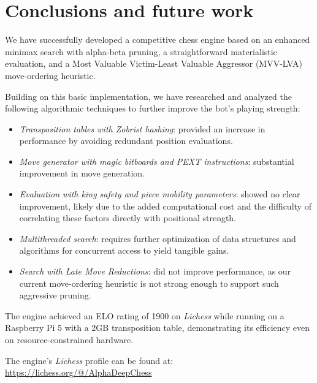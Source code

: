 \chapter{Conclusions and future work}

We have successfully developed a competitive chess engine based on an enhanced minimax search with alpha-beta pruning, a straightforward materialistic evaluation, and a Most Valuable Victim-Least Valuable Aggressor (MVV-LVA) move-ordering heuristic.

\vspace{1em}

\noindent Building on this basic implementation, we have researched and analyzed the following algorithmic techniques to further improve the bot's playing strength:

\begin{itemize}[itemsep=1pt]
    \item \textit{Transposition tables with Zobrist hashing}: provided an increase in performance by avoiding redundant position evaluations.
    \item \textit{Move generator with magic bitboards and PEXT instructions}: substantial improvement in move generation.
    
    \item \textit{Evaluation with king safety and piece mobility parameters}: showed no clear improvement, likely due to the added computational cost and the difficulty of correlating these factors directly with positional strength.
    \item \textit{Multithreaded search}: requires further optimization of data structures and algorithms for concurrent access to yield tangible gains.
    \item \textit{Search with Late Move Reductions}: did not improve performance, as our current move-ordering heuristic is not strong enough to support such aggressive pruning.
\end{itemize}

\noindent The engine achieved an ELO rating of 1900 on \textit{Lichess} while running on a Raspberry Pi 5 with a 2GB transposition table, demonstrating its efficiency even on resource-constrained hardware.

\vspace{1em}

\noindent The engine's \textit{Lichess} profile can be found at:\\
\url{https://lichess.org/@/AlphaDeepChess}

\vspace{1em}

